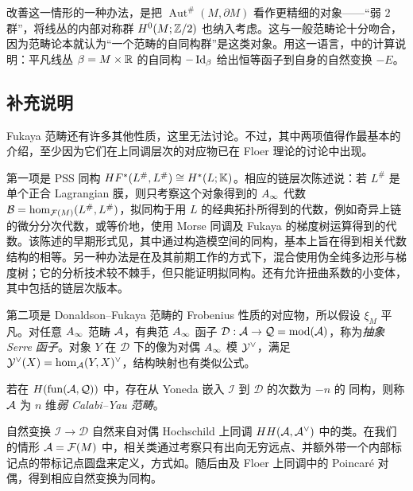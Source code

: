 改善这一情形的一种办法，是把 $\operatorname{Aut}^\#(M,\allowbreak \partial M)$ 看作更精细的对象——“弱 $2$ 群”，将线丛的内部对称群 $H^0(M;\mathbb Z/2)$ 也纳入考虑。这与一般范畴论十分吻合，因为范畴论本就认为“一个范畴的自同构群”是这类对象。用这一语言，中的计算说明：平凡线丛 $\beta=M\times\mathbb R$ 的自同构 $-\operatorname{Id}_\beta$ 给出恒等函子到自身的自然变换 $-E$。

\subsection{补充说明}\label{sec:12j}
Fukaya 范畴还有许多其他性质，这里无法讨论。不过，其中两项值得作最基本的介绍，至少因为它们在上同调层次的对应物已在 Floer 理论的讨论中出现。

第一项是 PSS 同构 $HF^*(L^\#,\allowbreak L^\#)\cong H^*(L;\mathbb K)$。相应的链层次陈述说：若 $L^\#$ 是单个正合 Lagrangian 膜，则只考察这个对象得到的 $A_\infty$ 代数 $\mathcal B=\operatorname{hom}_{\mathcal F(M)}(L^\#,\allowbreak L^\#)$，拟同构于用 $L$ 的经典拓扑所得到的代数，例如奇异上链的微分分次代数，或等价地，使用 Morse 同调及 Fukaya 的梯度树运算得到的代数。该陈述的早期形式见，其中通过构造模空间的同构，基本上旨在得到相关代数结构的相等。另一种办法是在及其前期工作的方式下，混合使用伪全纯多边形与梯度树；它的分析技术较不棘手，但只能证明拟同构。还有允许扭曲系数的小变体，其中包括的链层次版本。

第二项是 Donaldson–Fukaya 范畴的 Frobenius 性质的对应物，所以假设 $\xi_M$ 平凡。对任意 $A_\infty$ 范畴 $\mathcal A$，有典范 $A_\infty$ 函子 $\mathcal D:\mathcal A\to\mathcal Q=\operatorname{mod}(\mathcal A)$，称为\emph{抽象 Serre 函子}。对象 $Y$ 在 $\mathcal D$ 下的像为对偶 $A_\infty$ 模 $\mathcal Y^\vee$，满足 $\mathcal Y^\vee(X)=\operatorname{hom}_{\mathcal A}(Y,\allowbreak X)^\vee$，结构映射也有类似公式。
\begin{definition*}
若在 $H(\operatorname{fun}(\mathcal A,\allowbreak \mathcal Q))$ 中，存在从 Yoneda 嵌入 $\mathcal I$ 到 $\mathcal D$ 的次数为 $-n$ 的
同构，则称 $\mathcal A$ 为 $n$ 维\emph{弱 Calabi–Yau 范畴}。
\end{definition*}
自然变换 $\mathcal I\to\mathcal D$ 自然来自对偶 Hochschild 上同调 $HH(\mathcal A,\allowbreak \mathcal A^\vee)$ 中的类。在我们的情形 $\mathcal A=\mathcal F(M)$ 中，相关类通过考察只有出向无穷远点、并额外带一个内部标记点的带标记点圆盘来定义，方式如。随后由及 Floer 上同调中的 Poincaré 对偶，得到相应自然变换为同构。
